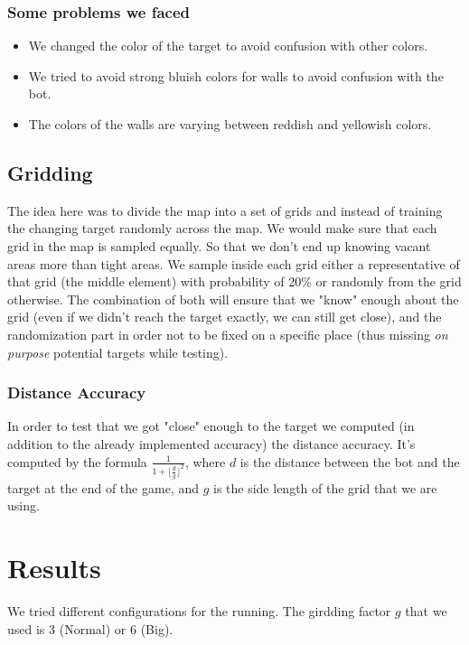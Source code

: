 \documentclass[a4paper]{article}
\begin{document}
\subsubsection{Some problems we faced}
\begin{itemize}
    \item We changed the color of the target to avoid confusion with other colors.
    \item We tried to avoid strong bluish colors for walls to avoid confusion with the bot.
    \item The colors of the walls are varying between reddish and yellowish colors.
\end{itemize}

\subsection{Gridding}
The idea here was to divide the map into a set of grids and instead of training the changing target randomly across the map.
We would make sure that each grid in the map is sampled equally. So that we don't end up knowing vacant areas more than tight areas.
We sample inside each grid either a representative of that grid (the middle element) with probability of 20\% or randomly from the grid otherwise. The combination of both will ensure that we "know" enough about the grid (even if we didn't reach the target exactly, we can still get close), and the randomization part in order not to be fixed on a specific place (thus missing {\it on purpose} potential targets while testing).

\subsubsection{Distance Accuracy}
In order to test that we got "close" enough to the target we computed (in addition to the already implemented accuracy) the distance accuracy.
It's computed by the formula $\frac{1}{1 + {\lfloor \frac{d}{g} \rfloor}^2}$, where $d$ is the distance between the bot and the target at the end of the game, and $g$ is the side length of the grid that we are using.

\section{Results}
We tried different configurations for the running. The girdding factor $g$ that we used is $3$ (Normal) or $6$ (Big).
\end{document}
